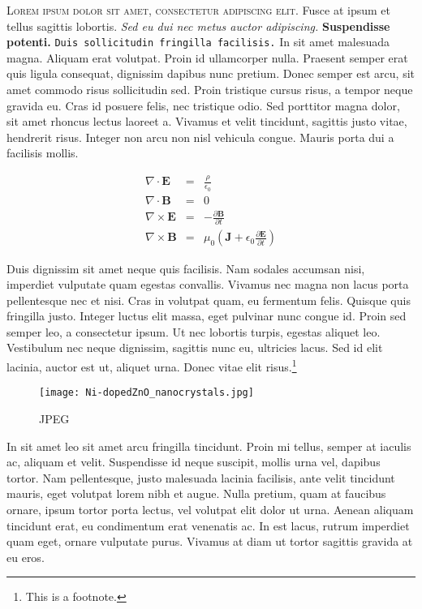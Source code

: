 \documentclass[12pt]{article}
\begin{document}

\textsc{Lorem ipsum dolor sit amet, consectetur adipiscing elit.}
Fusce at ipsum et tellus sagittis lobortis. \textit{Sed eu dui nec
  metus auctor adipiscing.} \textbf{Suspendisse potenti.} \texttt{Duis
  sollicitudin fringilla facilisis.} \textsf{In sit amet malesuada
  magna.} Aliquam erat volutpat. Proin id ullamcorper nulla. Praesent
semper erat quis ligula consequat, dignissim dapibus nunc
pretium. Donec semper est arcu, sit amet commodo risus sollicitudin
sed. Proin tristique cursus risus, a tempor neque gravida eu. Cras id
posuere felis, nec tristique odio. Sed porttitor magna dolor, sit amet
rhoncus lectus laoreet a. Vivamus et velit tincidunt, sagittis justo
vitae, hendrerit risus. Integer non arcu non nisl vehicula
congue. Mauris porta dui a facilisis mollis.

\begin{eqnarray}
  \label{eq:maxwell}
  \nabla \cdot \mathbf{E} & = & \frac{\rho}{\epsilon_0}\\
  \nabla \cdot \mathbf{B} & = & 0\\
  \nabla \times \mathbf{E} & = & - \frac{\partial \mathbf{B}}{\partial
    t}\\
  \nabla \times \mathbf{B} & = & \mu_0 \left(\mathbf{J} + \epsilon_0
  \frac{\partial \mathbf{E}}{\partial t}\right)
\end{eqnarray}

Duis dignissim sit amet neque quis facilisis. Nam sodales accumsan
nisi, imperdiet vulputate quam egestas convallis. Vivamus nec magna
non lacus porta pellentesque nec et nisi. Cras in volutpat quam, eu
fermentum felis. Quisque quis fringilla justo. Integer luctus elit
massa, eget pulvinar nunc congue id. Proin sed semper leo, a
consectetur ipsum. Ut nec lobortis turpis, egestas aliquet
leo. Vestibulum nec neque dignissim, sagittis nunc eu, ultricies
lacus. Sed id elit lacinia, auctor est ut, aliquet urna. Donec vitae
elit risus.\footnote{This is a footnote.}

\begin{figure}
  \centering
  \texttt{[image: Ni-dopedZnO\_nanocrystals.jpg]}
  \caption{JPEG}
  \label{fig:jpeg}
\end{figure}

In sit amet leo sit amet arcu fringilla tincidunt. Proin mi tellus,
semper at iaculis ac, aliquam et velit. Suspendisse id neque suscipit,
mollis urna vel, dapibus tortor. Nam pellentesque, justo malesuada
lacinia facilisis, ante velit tincidunt mauris, eget volutpat lorem
nibh et augue. Nulla pretium, quam at faucibus ornare, ipsum tortor
porta lectus, vel volutpat elit dolor ut urna. Aenean aliquam
tincidunt erat, eu condimentum erat venenatis ac. In est lacus, rutrum
imperdiet quam eget, ornare vulputate purus. Vivamus at diam ut tortor
sagittis gravida at eu eros.
\end{document}
